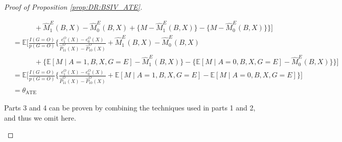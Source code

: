 \documentclass[10pt]{article}
\newcommand{\E}{\mathbb{E}}
\begin{document}
\begin{proof}[Proof of Proposition \ref{prop:DR:BSIV_ATE}]
\begin{itemize}
{\begin{align*}
&\quad\quad\quad+\hat{M}_{1}^{E}(B,X)-\hat{M}_{0}^{E}(B,X)+\{M-\hat{M}_{1}^{E}(B,X)\}-\{M-\hat{M}_{0}^{E}(B,X)\}\bigg\}\Big]\\
&=\E\Big[\frac{I(G=O)}{p(G=O)}\Bigg\{\frac{e_1^O(X)-e_0^O(X)}{\hat{P}_{11}^O(X)-\hat{P}_{10}^O(X)}+\hat{M}_{1}^{E}(B,X)-\hat{M}_{0}^{E}(B,X)\\
&\quad\quad\quad+\{\E[M\mid A=1,B,X,G=E]-\hat{M}_{1}^{E}(B,X)\}-\{\E[M\mid A=0,B,X,G=E]-\hat{M}_{0}^{E}(B,X)\}\bigg\}\Big]\\
&=\E\Big[\frac{I(G=O)}{p(G=O)}\Bigg\{\frac{e_1^O(X)-e_0^O(X)}{\hat{P}_{11}^O(X)-\hat{P}_{10}^O(X)}+\E[M\mid A=1,B,X,G=E]-\E[M\mid A=0,B,X,G=E]\bigg\}\Big]\\
&=\theta_{\text{ATE}}
\end{align*}}
\endgroup

Parts 3 and 4 can be proven by combining the techniques used in parts 1 and 2, and thus we omit here.




\end{itemize}
\end{proof}
\end{document}
